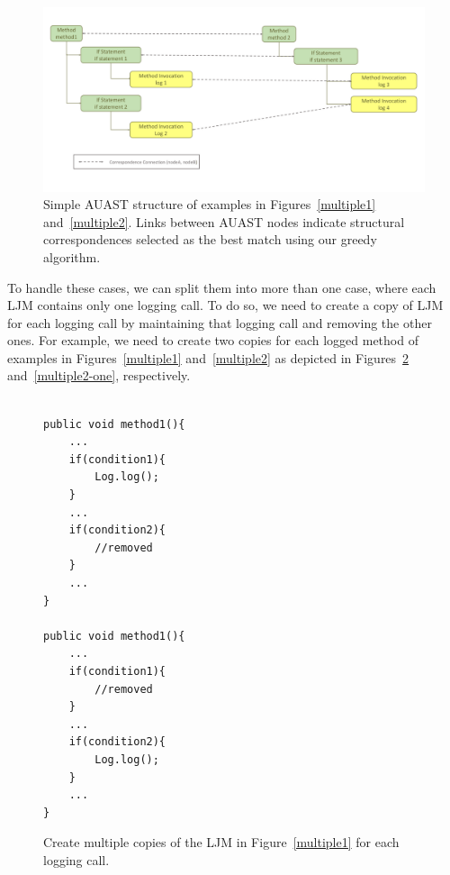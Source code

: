 \begin{figure} [H]
  \centering\includegraphics [width = \textwidth]{Drawing4/multipleLogging2.pdf}
  \caption{Simple AUAST structure of examples in Figures~\ref{multiple1} and~\ref{multiple2}. Links between AUAST nodes indicate structural correspondences selected as the best match using our greedy algorithm.}
  \label{m_ast2}
\end{figure}

To handle these cases, we can split them into more than one case, where each LJM contains only one logging call. To do so, we need to create a copy of LJM for each logging call by maintaining that logging call and removing the other ones. For example, we need to create two copies for each logged  method of examples in Figures~\ref{multiple1} and~\ref{multiple2} as depicted in Figures~\ref{multiple1-one} and~\ref{multiple2-one}, respectively.


\begin{figure}[H]
\def\baselinestretch{1}
\begin{lstlisting}

public void method1(){
	...
	if(condition1){
		Log.log();
	}
	...
	if(condition2){
		//removed
	}
	...
}

public void method1(){
	...
	if(condition1){
		//removed
	}
	...
	if(condition2){
		Log.log();
	}
	...
}

\end{lstlisting}
\caption{Create multiple copies of the LJM in Figure~\ref{multiple1} for each logging call.\label{multiple1-one}}
\end{figure}



